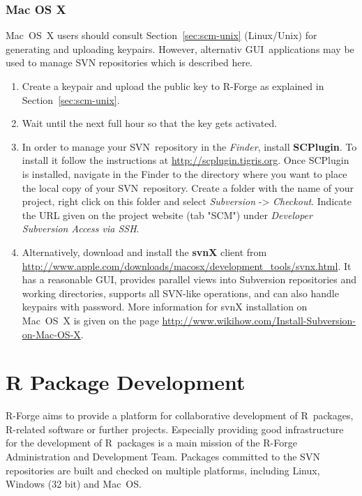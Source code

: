 \documentclass[a4paper]{article}
\newcommand{\RFORGE}{\proglang{R}-Forge Administration and Development Team}
\newcommand{\proglang}[1]{\textsf{#1}}
\begin{document}
\subsubsection{Mac OS X}
\label{sec:scm-macosx}
Mac~OS~X users should consult Section~\ref{sec:scm-unix} (Linux/Unix)
for generating and uploading keypairs. However, alternativ
GUI~applications may be used to manage SVN repositories which is
described here.

\begin{enumerate}
\item Create a keypair and upload the public key to \proglang{R}-Forge
  as explained in Section~\ref{sec:scm-unix}.

\item Wait until the next full hour so that the key gets activated.

\item In order to manage your SVN~repository in the \textit{Finder},
  install \textbf{SCPlugin}. To install it follow the instructions at
  \url{http://scplugin.tigris.org}. Once SCPlugin is installed,
  navigate in the Finder to the directory where you want to place the
  local copy of your SVN~repository. Create a folder with the name of
  your project, right click on this folder and select
  \textit{Subversion} -> \textit{Checkout}. Indicate the URL given on
  the project website (tab "SCM") under \textit{Developer Subversion
    Access via SSH}.
\item Alternatively, download and install the \textbf{svnX} client
  from
  \url{http://www.apple.com/downloads/macosx/development_tools/svnx.html}.
  It has a reasonable GUI, provides parallel views into Subversion
  repositories and working directories, supports all SVN-like
  operations, and can also handle keypairs with password. More
  information for svnX installation on Mac~OS~X is given on the page
  \url{http://www.wikihow.com/Install-Subversion-on-Mac-OS-X}.
\end{enumerate}

\section{\proglang{R} Package Development}

\proglang{R}-Forge aims to provide a platform for collaborative development of
\proglang{R}~packages, \proglang{R}-related software or further
projects. Especially providing good infrastructure for the development of
\proglang{R}~packages is a main mission of the \RFORGE{}. Packages
committed to the SVN repositories are built and checked on multiple
platforms, including Linux, Windows (32 bit) and Mac~OS. 
\end{document}
